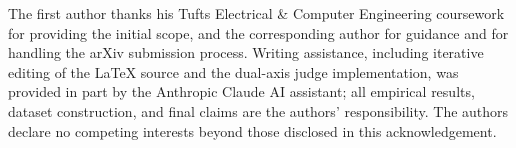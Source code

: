 \documentclass{article}
\begin{document}
\begin{ack}
The first author thanks his Tufts Electrical \& Computer Engineering coursework for providing the initial scope, and the corresponding author for guidance and for handling the arXiv submission process. Writing assistance, including iterative editing of the LaTeX source and the dual-axis judge implementation, was provided in part by the Anthropic Claude AI assistant; all empirical results, dataset construction, and final claims are the authors' responsibility. The authors declare no competing interests beyond those disclosed in this acknowledgement.
\end{ack}

{
\small


}

\newpage


\appendix



\end{document}
